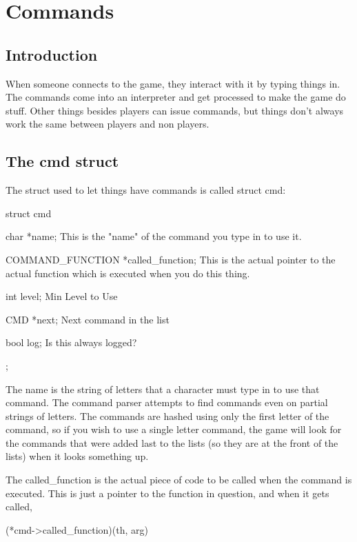 \chapter{Commands}


\section{Introduction}


When someone connects to the game, they interact with it by typing
things in. The commands come into an interpreter and get processed to
make the game do stuff. Other things besides players can issue
commands, but things don't always work the same between players and
non players.


\section{The cmd struct}

The struct used to let things have commands is called struct cmd:


struct cmd

{

  char *name;                        This is the "name" of the command
				       you type in to use it. 

  COMMAND\_FUNCTION *called\_function;  This is the actual pointer to the
					actual function which is executed
					when you do this thing. 

  int level;                          Min Level to Use 

  CMD *next;                          Next command in the list 

  bool log;                           Is this always logged? 

};


The name is the string of letters that a character must type in to use
that command. The command parser attempts to find commands even on
partial strings of letters. The commands are hashed using only the
first letter of the command, so if you wish to use a single letter
command, the game will look for the commands that were added last to
the lists (so they are at the front of the lists) when it looks
something up.

The called\_function is the actual piece of code to be called when the
command is executed. This is just a pointer to the function in
question, and when it gets called, 

(*cmd->called\_function)(th, arg) 


